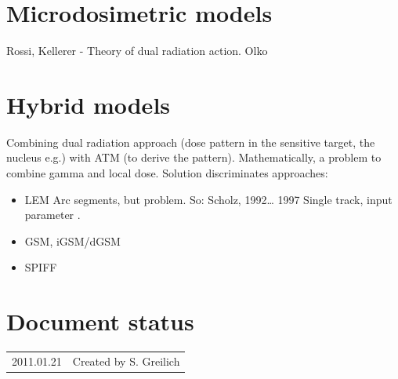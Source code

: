 \section{Microdosimetric models}
Rossi, Kellerer - Theory of dual radiation action.
Olko

\section{Hybrid models}
Combining dual radiation approach (dose pattern in the sensitive target, the
nucleus e.g.) with ATM (to derive the pattern). Mathematically, a problem to
combine gamma and local dose. Solution discriminates approaches:
\begin{itemize}
  \item{LEM Arc segments, but problem. So: Scholz, 1992\ldots{} 1997 Single
  track, input parameter \cite{Geiss_et_al_1997, Bassler_et_al_2008}.}
  \item{GSM, iGSM/dGSM}
  \item{SPIFF}
\end{itemize}


\section*{Document status}
\begin{tabular}{l l}
2011.01.21&Created by S. Greilich
\end{tabular} 